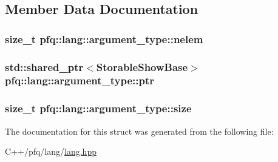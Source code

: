 \subsection{Member Data Documentation}
\subsubsection[{\texorpdfstring{nelem}{nelem}}]{\setlength{\rightskip}{0pt plus 5cm}size\+\_\+t pfq\+::lang\+::argument\+\_\+type\+::nelem}\hypertarget{structpfq_1_1lang_1_1argument__type_ac0016fd1fba8c2cb6922093a9561473f}{}\label{structpfq_1_1lang_1_1argument__type_ac0016fd1fba8c2cb6922093a9561473f}
\subsubsection[{\texorpdfstring{ptr}{ptr}}]{\setlength{\rightskip}{0pt plus 5cm}std\+::shared\+\_\+ptr$<$Storable\+Show\+Base$>$ pfq\+::lang\+::argument\+\_\+type\+::ptr}\hypertarget{structpfq_1_1lang_1_1argument__type_a5b291ef1d2a04a9e238ad29643a77830}{}\label{structpfq_1_1lang_1_1argument__type_a5b291ef1d2a04a9e238ad29643a77830}
\subsubsection[{\texorpdfstring{size}{size}}]{\setlength{\rightskip}{0pt plus 5cm}size\+\_\+t pfq\+::lang\+::argument\+\_\+type\+::size}\hypertarget{structpfq_1_1lang_1_1argument__type_ae5d502317434728683578c32b6056275}{}\label{structpfq_1_1lang_1_1argument__type_ae5d502317434728683578c32b6056275}


The documentation for this struct was generated from the following file\+:\begin{DoxyCompactItemize}
\item 
C++/pfq/lang/\hyperlink{lang_8hpp}{lang.\+hpp}\end{DoxyCompactItemize}
